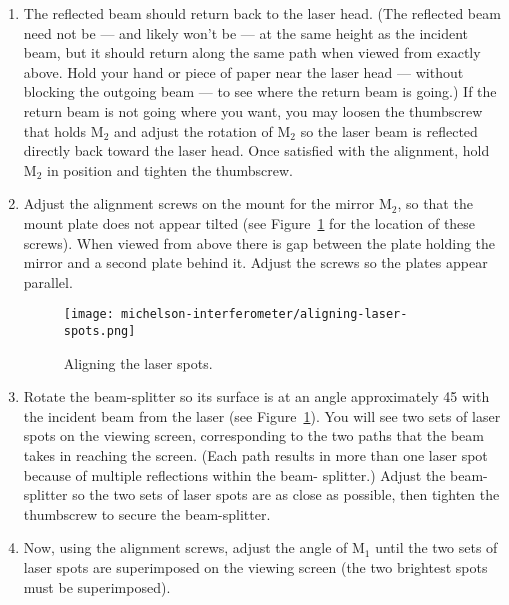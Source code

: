 \begin{enumerate}
	\item The reflected beam should return back to the laser head. (The reflected beam need not be --- and likely won’t be --- at the
	same height as the incident beam, but it should return along the same path when viewed from exactly above. Hold
	your hand or piece of paper near the laser head --- without blocking the outgoing beam --- to see where the return beam
	is going.) If the return beam is not going where you want, you may loosen the thumbscrew that holds M$_2$ and adjust
	the rotation of M$_2$ so the laser beam is reflected directly back toward the laser head. Once satisfied with the alignment,
	hold M$_2$ in position and tighten the thumbscrew.
	
	\item Adjust the alignment screws on the mount for the mirror M$_2$, so that the mount plate does not appear tilted (see Figure~\ref{mi:fig:aligning-spots} for the location of these screws). When viewed from above there is gap between the plate holding the mirror and a
	second plate behind it. Adjust the screws so the plates appear parallel.
	
	\begin{figure}
		\centering
		\texttt{[image: michelson-interferometer/aligning-laser-spots.png]}
		\caption{Aligning the laser spots.}\label{mi:fig:aligning-spots}
	\end{figure}

	\item Rotate the beam-splitter so its surface is at an angle approximately 45 with the incident beam from the laser (see Figure~\ref{mi:fig:aligning-spots}). You will see two sets of laser spots on the viewing screen, corresponding to the two paths that the beam takes in reaching the screen. (Each path results in more than one laser spot because of multiple reflections within the beam-
	splitter.) Adjust the beam-splitter so the two sets of laser spots are as close as possible, then tighten the thumbscrew
	to secure the beam-splitter.
	
	\item Now, using the alignment screws, adjust the angle of M$_1$ until the two sets of laser spots are superimposed on the
	viewing screen (the two brightest spots must be superimposed).
	

\end{enumerate}
